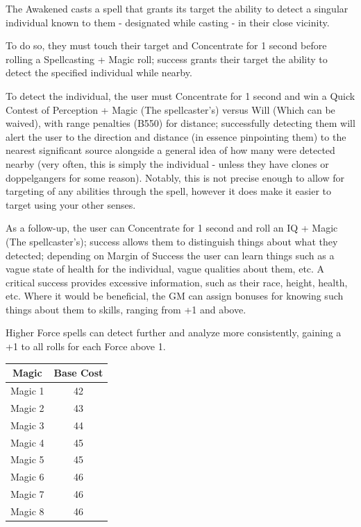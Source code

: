 \begin{multicols*}{3}
	The Awakened casts a spell that grants its target the ability to detect a singular individual known to them - designated while casting - in their close vicinity.
	
	To do so, they must touch their target and Concentrate for 1 second before rolling a Spellcasting + Magic roll; success grants their target the ability to detect the specified individual while nearby.
	
	To detect the individual, the user must Concentrate for 1 second and win a Quick Contest of Perception + Magic (The spellcaster's) versus Will (Which can be waived), with range penalties (B550) for distance; successfully detecting them will alert the user to the direction and distance (in essence pinpointing them) to the nearest significant source alongside a general idea of how many were detected nearby (very often, this is simply the individual - unless they have clones or doppelgangers for some reason).  Notably, this is not precise enough to allow for targeting of any abilities through the spell, however it does make it easier to target using your other senses.
	
	As a follow-up, the user can Concentrate for 1 second and roll an IQ + Magic (The spellcaster's); success allows them to distinguish things about what they detected; depending on Margin of Success the user can learn things such as a vague state of health for the individual, vague qualities about them, etc. A critical success provides excessive information, such as their race, height, health, etc. Where it would be beneficial, the GM can assign bonuses for knowing such things about them to skills, ranging from +1 and above.
	
	Higher Force spells can detect further and analyze more consistently, gaining a +1 to all rolls for each Force above 1.		
	
	\begin{center}
		\begin{tabular}{|c|c|}
			\hline
			Magic & Base Cost \\
			\hline
			\hline
			Magic 1 & 42 \\
			Magic 2 & 43 \\
			Magic 3 & 44 \\
			Magic 4 & 45 \\
			Magic 5 & 45 \\
			Magic 6 & 46 \\
			Magic 7 & 46 \\
			Magic 8 & 46 \\
			\hline
		\end{tabular}
	\end{center} 
	

\end{multicols*}
